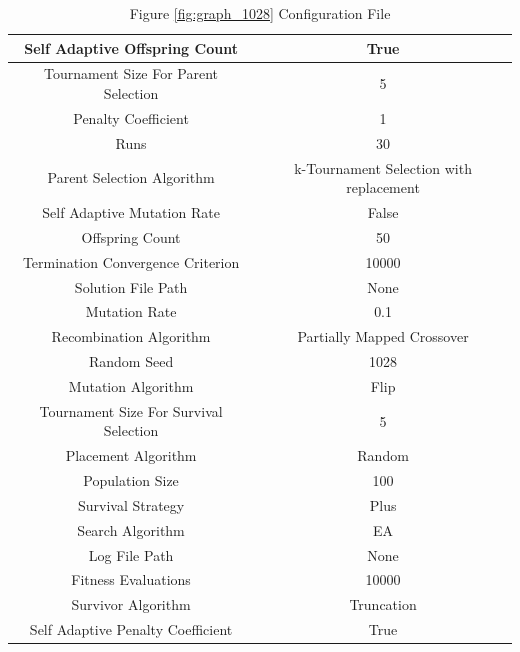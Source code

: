 \documentclass{standalone}
\begin{document}
\begin{table}[!htb]
	\centering
	\caption{Figure \ref{fig:graph_1028} Configuration File}
	\label{tab:graph_1028}
	\begin{tabular}{| c | c |}
		\hline
		Self Adaptive Offspring Count		& True		 \\
		\hline
		Tournament Size For Parent Selection		& 5		 \\
		\hline
		Penalty Coefficient		& 1		 \\
		\hline
		Runs		& 30		 \\
		\hline
		Parent Selection Algorithm		& k-Tournament Selection with replacement		 \\
		\hline
		Self Adaptive Mutation Rate		& False		 \\
		\hline
		Offspring Count		& 50		 \\
		\hline
		Termination Convergence Criterion		& 10000		 \\
		\hline
		Solution File Path		& None		 \\
		\hline
		Mutation Rate		& 0.1		 \\
		\hline
		Recombination Algorithm		& Partially Mapped Crossover		 \\
		\hline
		Random Seed		& 1028		 \\
		\hline
		Mutation Algorithm		& Flip		 \\
		\hline
		Tournament Size For Survival Selection		& 5		 \\
		\hline
		Placement Algorithm		& Random		 \\
		\hline
		Population Size		& 100		 \\
		\hline
		Survival Strategy		& Plus		 \\
		\hline
		Search Algorithm		& EA		 \\
		\hline
		Log File Path		& None		 \\
		\hline
		Fitness Evaluations		& 10000		 \\
		\hline
		Survivor Algorithm		& Truncation		 \\
		\hline
		Self Adaptive Penalty Coefficient		& True		 \\
		\hline
	\end{tabular}
\end{table}
\end{document}
